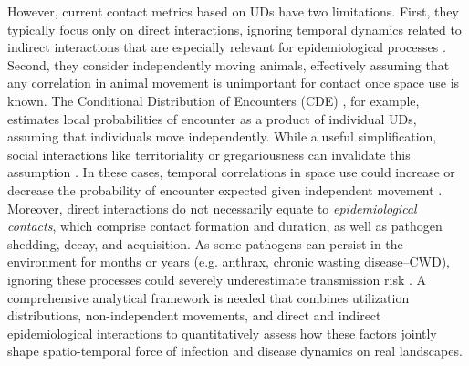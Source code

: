 ﻿\documentclass[11pt]{article}
\begin{document}
However, current contact metrics based on UDs have two limitations. First, they typically focus only on direct interactions, ignoring temporal dynamics related to indirect interactions that are especially relevant for epidemiological processes \citep{Yang2023}. Second, they consider independently moving animals, effectively assuming that any correlation in animal movement is unimportant for contact once space use is known. The Conditional Distribution of Encounters (CDE) \citep{Noonan2021}, for example, estimates local probabilities of encounter as a product of individual UDs, assuming that individuals move independently.
While a useful simplification, social interactions like territoriality or gregariousness can invalidate this assumption \citep{Manlove2018,Sah2018}. In these cases, temporal correlations in space use could increase or decrease the probability of encounter expected given independent movement \citep{Kjaer2008,Schauber2015a}. 
Moreover, direct interactions do not necessarily equate to \emph{epidemiological contacts}, which comprise contact formation and duration, as well as pathogen shedding, decay, and acquisition. As some pathogens can persist in the environment for months or years (e.g. anthrax, chronic wasting disease--CWD), ignoring these processes could severely underestimate transmission risk \citep{Wilber2022,Yang2023,Richardson2015}.  A comprehensive analytical framework is needed that combines utilization distributions, non-independent movements, and direct and indirect epidemiological interactions to quantitatively assess how these factors jointly shape spatio-temporal force of infection and disease dynamics on real landscapes.

\end{document}
